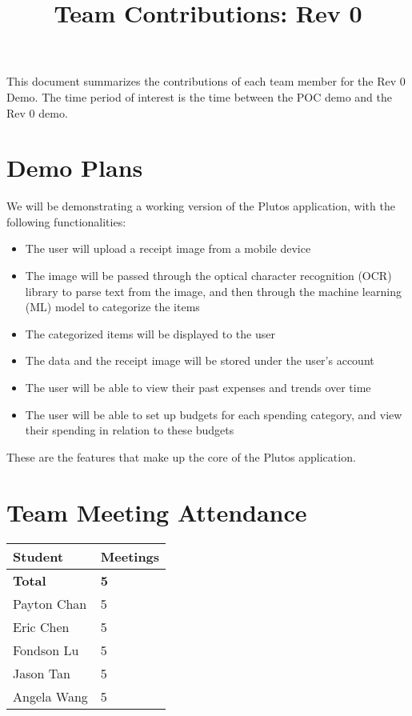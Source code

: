 \documentclass{article}
\title{Team Contributions: Rev 0\\\progname}
\author{\authname}
\date{}
\begin{document}
\maketitle

This document summarizes the contributions of each team member for the Rev 0
Demo.  The time period of interest is the time between the POC demo and the Rev
0 demo.

\section{Demo Plans}

We will be demonstrating a working version of the Plutos application, with the
following functionalities:
\begin{itemize}
    \item The user will upload a receipt image from a mobile device
    \item The image will be passed through the optical character recognition
    (OCR) library to parse text from the image, and then through the machine
    learning (ML) model to categorize the items
    \item The categorized items will be displayed to the user
    \item The data and the receipt image will be stored under the user's account
    \item The user will be able to view their past expenses and trends over time
    \item The user will be able to set up budgets for each spending category,
    and view their spending in relation to these budgets
\end{itemize}

\noindent These are the features that make up the core of the Plutos application.

\section{Team Meeting Attendance}


\begin{table}[H]
\centering
\begin{tabular}{ll}
\toprule
\textbf{Student} & \textbf{Meetings}\\
\midrule
\textbf{Total} & \textbf{5}\\
Payton Chan & 5\\
Eric Chen & 5\\
Fondson Lu & 5\\
Jason Tan & 5\\
Angela Wang & 5\\
\bottomrule
\end{tabular}
\end{table}
\end{document}

